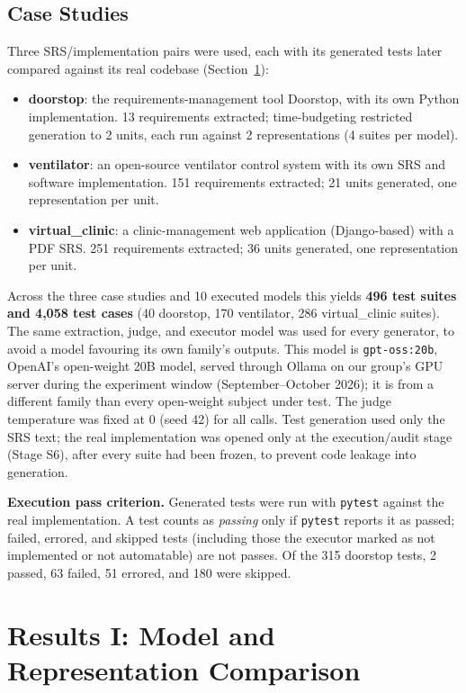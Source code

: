 \documentclass[conference]{IEEEtran}
\begin{document}
  \subsection{Case Studies}
  Three SRS/implementation pairs were used, each with its generated tests later
  compared against its real codebase (Section~\ref{sec:results}):
  \begin{itemize}
  \item \textbf{doorstop}: the requirements-management tool Doorstop, with
  its own Python implementation. 13 requirements extracted; time-budgeting
  restricted generation to 2 units, each run against 2 representations
  (4 suites per model).
  \item \textbf{ventilator}: an open-source ventilator control system with
  its own SRS and software implementation. 151 requirements extracted; 21
  units generated, one representation per unit.
  \item \textbf{virtual\_clinic}: a clinic-management web application
  (Django-based) with a PDF SRS. 251 requirements extracted; 36 units
  generated, one representation per unit.
  \end{itemize}
  Across the three case studies and 10 executed models this yields
  \textbf{496 test suites and 4{,}058 test cases} (40 doorstop, 170 ventilator,
  286 virtual\_clinic suites). 
  The same extraction, judge, and executor model was used for every generator,
  to avoid a model favouring its own family's outputs. This model is
  \texttt{gpt-oss:20b}, OpenAI's open-weight 20B model, served through Ollama on
  our group's GPU server during the experiment window (September--October 2026);
  it is from a different family than every open-weight subject under test. The
  judge temperature was fixed at 0 (seed 42) for all calls. Test generation used
  only the SRS text; the real implementation was opened only at the
  execution/audit stage (Stage S6), after every suite had been frozen, to prevent
  code leakage into generation.

  \textbf{Execution pass criterion.} Generated tests were run with
  \texttt{pytest} against the real implementation. A test counts as \emph{passing}
  only if \texttt{pytest} reports it as passed; failed, errored, and skipped tests
  (including those the executor marked as not implemented or not automatable) are
  not passes. Of the 315 doorstop tests, 2 passed, 63 failed, 51 errored, and 180
  were skipped.

  \section{Results I: Model and Representation Comparison}
  \label{sec:results}
\end{document}

